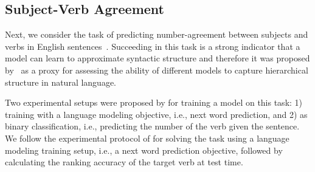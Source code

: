 \subsection{Subject-Verb Agreement}
Next, we consider the task of predicting number-agreement between subjects and verbs in English sentences~\citep{linzen2016assessing}. Succeeding in this task is a strong indicator that a model can learn to approximate syntactic structure and therefore it was proposed by~\citet{linzen2016assessing} as a proxy for assessing the ability of different models to capture hierarchical structure in natural language. 

Two experimental setups were proposed by \citet{linzen2016assessing} for training a model on this task: 1) training with a language modeling objective, i.e., next word prediction, and 2) as binary classification, i.e., predicting the number of the verb given the sentence. 
We follow the experimental protocol of \citet{linzen2016assessing} for solving the task using a language modeling training setup, i.e., a next word prediction objective, followed by calculating the ranking accuracy of the target verb at test time. 



